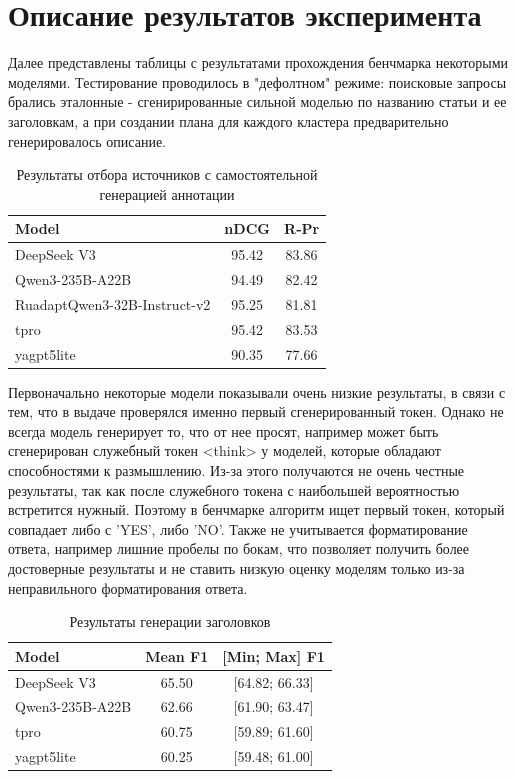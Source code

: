 \documentclass{article}
\theoremstyle{definition}
\theoremstyle{plain}
\begin{document}
\section*{Описание результатов эксперимента}
Далее представлены таблицы с результатами прохождения бенчмарка некоторыми моделями. Тестирование проводилось в "дефолтном" режиме: поисковые запросы брались эталонные - сгенирированные сильной моделью по названию статьи и ее заголовкам, а
при создании плана для каждого кластера предварительно генерировалось описание.

\begin{table}[ht]
\centering
\caption{Результаты отбора источников с самостоятельной генерацией аннотации}
\begin{tabular}{l|c|c}
\hline
\textbf{Model} & \textbf{nDCG} & \textbf{R‑Pr} \\
\hline
DeepSeek V3 & 95.42 & 83.86 \\
Qwen3-235B-A22B & 94.49 & 82.42 \\
RuadaptQwen3-32B-Instruct-v2 & 95.25 & 81.81 \\
tpro & 95.42 & 83.53 \\
yagpt5lite & 90.35 & 77.66 \\
\hline
\end{tabular}
\end{table}

Первоначально некоторые модели показывали очень низкие результаты, в связи с тем, что в выдаче проверялся именно первый сгенерированный токен. Однако не всегда модель генерирует то, что от нее просят, например может быть сгенерирован служебный
токен <think> у моделей, которые обладают способностями к размышлению. Из-за этого получаются не очень честные результаты, так как после служебного токена с наибольшей вероятностью встретится нужный. Поэтому в бенчмарке алгоритм ищет первый токен,
который совпадает либо с 'YES', либо 'NO'. Также не учитывается форматирование ответа, например лишние пробелы по бокам, что позволяет получить более достоверные результаты и не ставить низкую оценку моделям только из-за неправильного форматирования ответа.

\begin{table}[ht]
\centering
\caption{Результаты генерации заголовков}
\begin{tabular}{l|c|c}
\hline
\textbf{Model} & \textbf{Mean F1} & \textbf{[Min; Max] F1} \\
\hline
DeepSeek V3 & 65.50 & [64.82; 66.33] \\
Qwen3-235B-A22B  & 62.66 & [61.90; 63.47] \\
tpro & 60.75 & [59.89; 61.60] \\
yagpt5lite & 60.25 & [59.48; 61.00] \\
\hline
\end{tabular}
\end{table}
\end{document}
